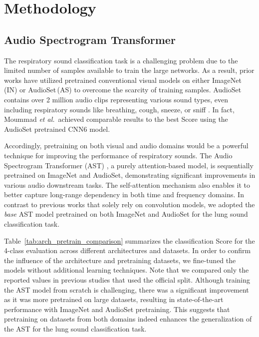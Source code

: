 \documentclass{INTERSPEECH2023}
\begin{document}
 

\section{Methodology}

\subsection{Audio Spectrogram Transformer}
\vspace{-2pt}


The respiratory sound classification task is a challenging problem due to the limited number of samples available to train the large networks. As a result, prior works have utilized pretrained conventional visual models on either ImageNet\,(IN) or AudioSet\,(AS) to overcome the scarcity of training samples. 
AudioSet contains over 2 million audio clips representing various sound types, even including respiratory sounds like breathing, cough, sneeze, or sniff \cite{audioset}. In fact, Moummad \textit{et al.}\,\cite{moummad2022supervised} achieved comparable results to the best Score using the AudioSet pretrained CNN6 model.

Accordingly, pretraining on both visual and audio domains would be a powerful technique for improving the performance of respiratory sounds. The Audio Spectrogram Transformer (AST) \cite{gong2021ast}, a purely attention-based model, is sequentially pretrained on ImageNet and AudioSet, demonstrating significant improvements in various audio downstream tasks. The self-attention mechanism also enables it to better capture long-range dependency in both time and frequency domains. In contrast to previous works that solely rely on convolution models, we adopted the \textit{base} AST model pretrained on both ImageNet and AudioSet for the lung sound classification task.

Table \,\ref{tab:arch_pretrain_comparison} summarizes the classification Score for the 4-class evaluation across different architectures and datasets. In order to confirm the influence of the architecture and pretraining datasets, we fine-tuned the models without additional learning techniques. Note that we compared only the reported values in previous studies that used the official split.
Although training the AST model from scratch is challenging, there was a significant improvement as it was more pretrained on large datasets, resulting in state-of-the-art performance with ImageNet and AudioSet pretraining. This suggests that pretraining on datasets from both domains indeed enhances the generalization of the AST for the lung sound classification task.
\vspace{-5pt}
\end{document}
